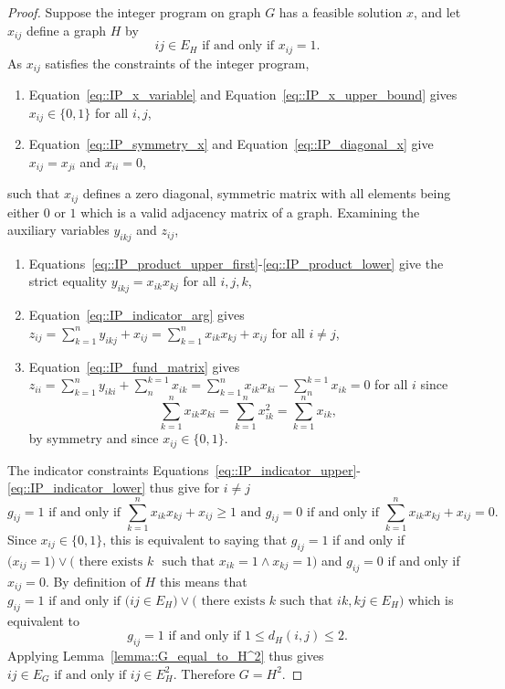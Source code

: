 \documentclass[11pt]{article}
\begin{document}
\begin{proof}
  Suppose the integer program on graph $G$ has a feasible solution $x$, and let $x_{ij}$ define a graph $H$ by 
  \[
  ij \in E_H \text{ if and only if } x_{ij} = 1. 
  \]
  As $x_{ij}$ satisfies the constraints of the integer program, 
  \begin{enumerate}[label=\roman*)]
    \item Equation~\eqref{eq::IP_x_variable} and Equation~\eqref{eq::IP_x_upper_bound} gives $x_{ij} \in \{0 , 1\}$ for all $i,j$,
    \item Equation~\eqref{eq::IP_symmetry_x} and Equation~\eqref{eq::IP_diagonal_x} give $x_{ij} = x_{ji}$ and $x_{ii} = 0$,
  \end{enumerate}
  such that $x_{ij}$ defines a zero diagonal, symmetric matrix with all elements being either $0$ or $1$ which is a valid adjacency matrix of a graph. 
  Examining the auxiliary variables $y_{ikj}$ and $z_{ij}$, 
  \begin{enumerate}[label=\roman*)]
    \item Equations~\eqref{eq::IP_product_upper_first}-\eqref{eq::IP_product_lower} give the strict equality $y_{ikj} = x_{ik}x_{kj}$ for all $i,j,k$,
    \item Equation~\eqref{eq::IP_indicator_arg} gives $\displaystyle z_{ij} = \sum_{k = 1}^{n}y_{ikj} + x_{ij} = \sum_{k = 1}^{n}x_{ik}x_{kj} + x_{ij}$ for all $i \neq j$,
    \item Equation~\eqref{eq::IP_fund_matrix} gives $\displaystyle z_{ii} = \sum_{k = 1}^{n}y_{iki} + \sum_{n}^{k = 1}x_{ik} = \sum_{k = 1}^{n} x_{ik}x_{ki} - \sum_{n}^{k = 1}x_{ik} = 0$ for all $i$ since
    \[
    \sum_{k = 1}^{n} x_{ik}x_{ki} = \sum_{k = 1}^{n} x_{ik}^2 = \sum_{k = 1}^{n} x_{ik},
    \]
    by symmetry and since $x_{ij} \in \{0 , 1\}$. 
  \end{enumerate} 
  The indicator constraints Equations~\eqref{eq::IP_indicator_upper}-\eqref{eq::IP_indicator_lower} thus give for $i \neq j$
  \[
  g_{ij} = 1 \text{ if and only if } \sum_{k=1}^{n} x_{ik}x_{kj} + x_{ij} \geq 1  \text{ and }  g_{ij} = 0 \text{ if and only if } \sum_{k=1}^{n} x_{ik}x_{kj} + x_{ij} = 0. 
  \]
  Since $x_{ij} \in \{0,1\}$, this is equivalent to saying that $
  g_{ij} = 1$ if and only if $\Big(x_{ij} = 1 \Big) \lor \Big(\text{ there exists } k $ \newline
  $\text{ such that } x_{ik}= 1 \land x_{kj}=1\Big)$ and  $g_{ij} = 0$ if and only if $x_{ij} = 0$. 
  By definition of $H$ this means that $g_{ij} = 1 \text{ if and only if } \Big( ij \in E_H \Big) \lor \Big( \text{ there exists } k \text{ such that } ik,kj \in E_H\Big)$ which is equivalent to 
  \[
  g_{ij} = 1 \text{ if and only if } 1 \leq d_H(i,j) \leq 2. 
  \]
  Applying Lemma~\ref{lemma::G_equal_to_H^2} thus gives $ij \in E_G \text{ if and only if } ij \in E_H^2$. Therefore $G=H^2$. 
\end{proof}
\end{document}
